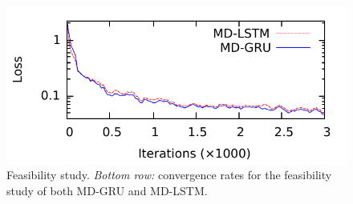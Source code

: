 \documentclass[varwidth=true, border=10pt, convert={size=640x}]{standalone}
\begin{document}
\begin{figure}
 \centering

  \begin{minipage}{0.80\textwidth}
    \includegraphics[width=.9\linewidth]{./images/convergence_rate_new10000_mediumlines_withtitle6.pdf}
  \end{minipage}
  \caption{Feasibility study. \emph{Bottom row:} convergence rates for the feasibility study of both MD-GRU and MD-LSTM.}
\label{feasibilityqualitative}

\end{figure}
\end{document}
